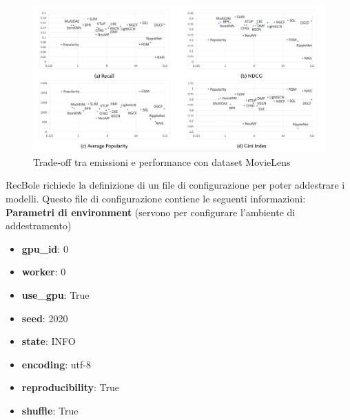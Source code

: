 \begin{figure}[H]
    \centering
    \includegraphics[width=\textwidth]{images/sum_movielens_dataset.png}
    \caption{Trade-off tra emissioni e performance con dataset MovieLens}
\end{figure}

\noindent RecBole richiede la definizione di un file di configurazione per poter addestrare i modelli. Questo file di configurazione contiene le seguenti informazioni:\\
\noindent \textbf{Parametri di environment} (servono per configurare l'ambiente di addestramento)
\begin{itemize}
    \item \textbf{gpu\_id}: 0
    \item \textbf{worker}: 0
    \item \textbf{use\_gpu}: True
    \item \textbf{seed}: 2020
    \item \textbf{state}: INFO
    \item \textbf{encoding}: utf-8
    \item \textbf{reproducibility}: True
    \item \textbf{shuffle}: True
\end{itemize}


